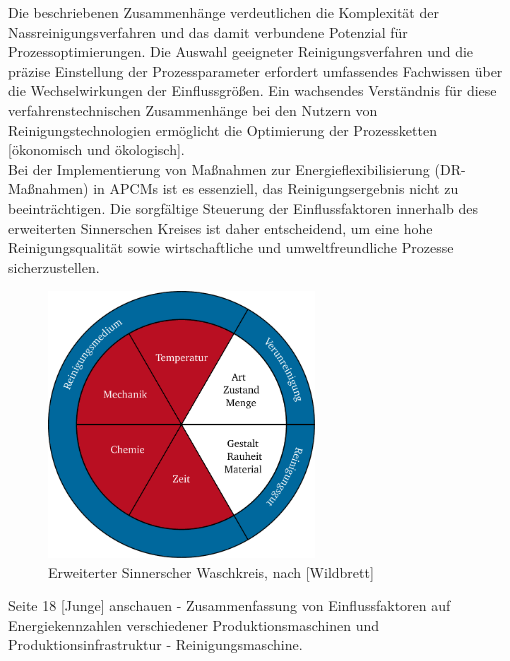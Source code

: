  Die beschriebenen Zusammenhänge verdeutlichen die Komplexität der Nassreinigungsverfahren und das damit verbundene Potenzial für Prozessoptimierungen. Die Auswahl geeigneter Reinigungsverfahren und die präzise Einstellung der Prozessparameter erfordert umfassendes Fachwissen über die Wechselwirkungen der Einflussgrößen. Ein wachsendes Verständnis für diese verfahrenstechnischen Zusammenhänge bei den Nutzern von Reinigungstechnologien ermöglicht die Optimierung der Prozessketten [ökonomisch und ökologisch].\\
 
 Bei der Implementierung von Maßnahmen zur Energieflexibilisierung (DR-Maßnahmen) in APCMs ist es essenziell, das Reinigungsergebnis nicht zu beeinträchtigen. Die sorgfältige Steuerung der Einflussfaktoren innerhalb des erweiterten Sinnerschen Kreises ist daher entscheidend, um eine hohe Reinigungsqualität sowie wirtschaftliche und umweltfreundliche Prozesse sicherzustellen.\\
 
 \begin{figure}[h]
 	\centering
 	\includegraphics[width=200pt]{figures/03_Grundlagen/Erweiterter Sinnerscher Waschkreis.pdf}
 	\caption{Erweiterter Sinnerscher Waschkreis, nach [Wildbrett]}
 	\label{fig_03Erweiterter Sinnerscher Waschkreis}
 \end{figure}
 
 Seite 18 [Junge] anschauen - Zusammenfassung von Einflussfaktoren auf Energiekennzahlen verschiedener Produktionsmaschinen und Produktionsinfrastruktur - Reinigungsmaschine.
